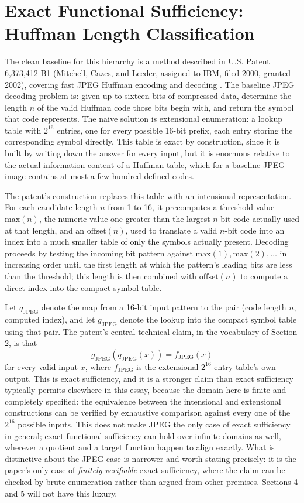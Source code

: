 \documentclass[11pt]{article}
\begin{document}
\section{Exact Functional Sufficiency: Huffman Length Classification}

The clean baseline for this hierarchy is a method described in U.S. Patent 6,373,412 B1 (Mitchell, Cazes, and Leeder, assigned to IBM, filed 2000, granted 2002), covering fast JPEG Huffman encoding and decoding \cite{mitchell2002}. The baseline JPEG decoding problem is: given up to sixteen bits of compressed data, determine the length $n$ of the valid Huffman code those bits begin with, and return the symbol that code represents. The naive solution is extensional enumeration: a lookup table with $2^{16}$ entries, one for every possible 16-bit prefix, each entry storing the corresponding symbol directly. This table is exact by construction, since it is built by writing down the answer for every input, but it is enormous relative to the actual information content of a Huffman table, which for a baseline JPEG image contains at most a few hundred defined codes.

The patent's construction replaces this table with an intensional representation. For each candidate length $n$ from 1 to 16, it precomputes a threshold value $\mathrm{max}(n)$, the numeric value one greater than the largest $n$-bit code actually used at that length, and an $\mathrm{offset}(n)$, used to translate a valid $n$-bit code into an index into a much smaller table of only the symbols actually present. Decoding proceeds by testing the incoming bit pattern against $\mathrm{max}(1), \mathrm{max}(2), \ldots$ in increasing order until the first length at which the pattern's leading bits are less than the threshold; this length is then combined with $\mathrm{offset}(n)$ to compute a direct index into the compact symbol table.

Let $q_{\mathrm{JPEG}}$ denote the map from a 16-bit input pattern to the pair (code length $n$, computed index), and let $g_{\mathrm{JPEG}}$ denote the lookup into the compact symbol table using that pair. The patent's central technical claim, in the vocabulary of Section 2, is that
\[
g_{\mathrm{JPEG}}(q_{\mathrm{JPEG}}(x)) = f_{\mathrm{JPEG}}(x)
\]
for every valid input $x$, where $f_{\mathrm{JPEG}}$ is the extensional $2^{16}$-entry table's own output. This is exact sufficiency, and it is a stronger claim than exact sufficiency typically permits elsewhere in this essay, because the domain here is finite and completely specified: the equivalence between the intensional and extensional constructions can be verified by exhaustive comparison against every one of the $2^{16}$ possible inputs. This does not make JPEG the only case of exact sufficiency in general; exact functional sufficiency can hold over infinite domains as well, wherever a quotient and a target function happen to align exactly. What is distinctive about the JPEG case is narrower and worth stating precisely: it is the paper's only case of \emph{finitely verifiable} exact sufficiency, where the claim can be checked by brute enumeration rather than argued from other premises. Sections 4 and 5 will not have this luxury.
\end{document}
